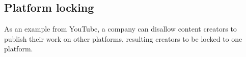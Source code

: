 \subsection{Platform locking}
As an example from YouTube, a company can disallow content creators to publish their work on other platforms, resulting creators to be locked to one platform.   




